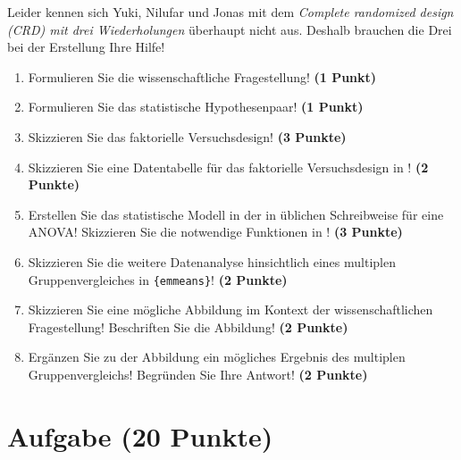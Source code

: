 \documentclass[a4paper, 9pt]{scrartcl}\usepackage[]{graphicx}\usepackage[]{xcolor}
\begin{document}
Leider kennen sich Yuki, Nilufar und Jonas mit dem \textit{Complete randomized design (CRD) mit drei Wiederholungen} überhaupt nicht aus. Deshalb brauchen die Drei bei der Erstellung Ihre Hilfe!

\begin{enumerate}
  \setcounter{enumi}{0}
  \item Formulieren Sie die wissenschaftliche Fragestellung! \textbf{(1 Punkt)}
  \item Formulieren Sie das statistische Hypothesenpaar! \textbf{(1 Punkt)}
  \item Skizzieren Sie das faktorielle Versuchsdesign! \textbf{(3 Punkte)}
  \item Skizzieren Sie eine Datentabelle für das faktorielle Versuchsdesign in \Rlogo! \textbf{(2 Punkte)}
  \item Erstellen Sie das statistische Modell in der in \Rlogo üblichen Schreibweise für eine ANOVA! Skizzieren Sie die notwendige Funktionen in \Rlogo! \textbf{(3 Punkte)}
  \item Skizzieren Sie die weitere Datenanalyse hinsichtlich eines multiplen Gruppenvergleiches in \texttt{\{emmeans\}}! \textbf{(2 Punkte)}
  \item Skizzieren Sie eine mögliche Abbildung im Kontext der wissenschaftlichen Fragestellung! Beschriften Sie die Abbildung! \textbf{(2 Punkte)}
  \item Ergänzen Sie zu der Abbildung ein mögliches Ergebnis des multiplen Gruppenvergleichs! Begründen Sie Ihre Antwort! \textbf{(2 Punkte)}
\end{enumerate}


 
\clearpage

\section{Aufgabe \hfill (20 Punkte)}
\end{document}
